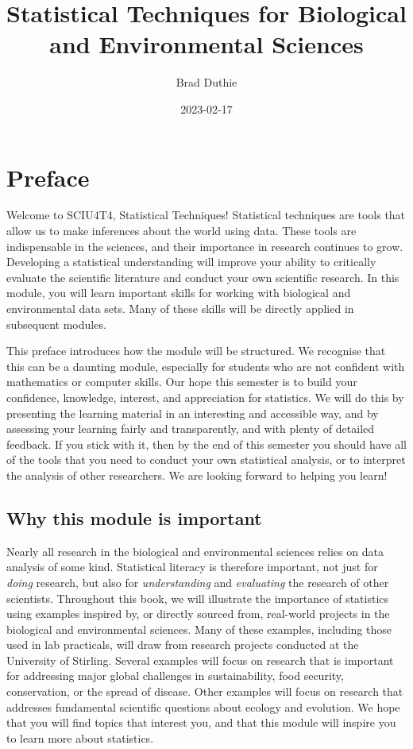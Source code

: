\documentclass[
]{scrbook}
\title{Statistical Techniques for Biological and Environmental Sciences}
\author{Brad Duthie}
\date{2023-02-17}
\begin{document}
\maketitle

{
\hypersetup{linkcolor=}
\setcounter{tocdepth}{1}
\tableofcontents
}
\hypertarget{preface}{%
\chapter*{Preface}\label{preface}}

Welcome to SCIU4T4, Statistical Techniques!
Statistical techniques are tools that allow us to make inferences about the world using data.
These tools are indispensable in the sciences, and their importance in research continues to grow.
Developing a statistical understanding will improve your ability to critically evaluate the scientific literature and conduct your own scientific research.
In this module, you will learn important skills for working with biological and environmental data sets.
Many of these skills will be directly applied in subsequent modules.

This preface introduces how the module will be structured.
We recognise that this can be a daunting module, especially for students who are not confident with mathematics or computer skills.
Our hope this semester is to build your confidence, knowledge, interest, and appreciation for statistics.
We will do this by presenting the learning material in an interesting and accessible way, and by assessing your learning fairly and transparently, and with plenty of detailed feedback.
If you stick with it, then by the end of this semester you should have all of the tools that you need to conduct your own statistical analysis, or to interpret the analysis of other researchers.
We are looking forward to helping you learn!

\hypertarget{why-this-module-is-important}{%
\section*{Why this module is important}\label{why-this-module-is-important}}

Nearly all research in the biological and environmental sciences relies on data analysis of some kind.
Statistical literacy is therefore important, not just for \emph{doing} research, but also for \emph{understanding} and \emph{evaluating} the research of other scientists.
Throughout this book, we will illustrate the importance of statistics using examples inspired by, or directly sourced from, real-world projects in the biological and environmental sciences.
Many of these examples, including those used in lab practicals, will draw from research projects conducted at the University of Stirling.
Several examples will focus on research that is important for addressing major global challenges in sustainability, food security, conservation, or the spread of disease.
Other examples will focus on research that addresses fundamental scientific questions about ecology and evolution.
We hope that you will find topics that interest you, and that this module will inspire you to learn more about statistics.
\end{document}
